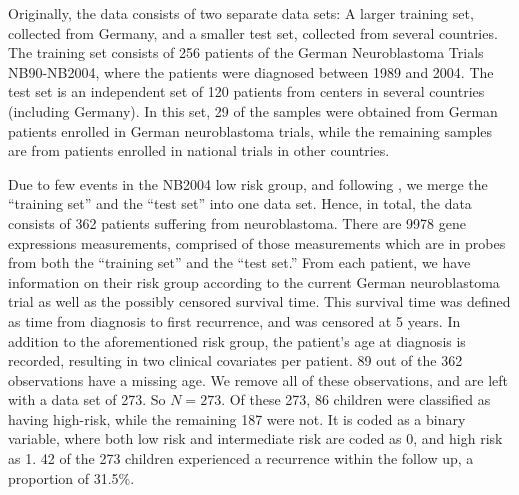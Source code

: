 Originally, the data consists of two separate data sets:
A larger training set, collected from Germany, and a smaller test set, collected from several countries.
The training set consists of 256 patients of the German Neuroblastoma Trials NB90-NB2004, where the patients were diagnosed between 1989 and 2004.
The test set is an independent set of 120 patients from centers in several countries (including Germany).
In this set, 29 of the samples were obtained from German patients enrolled in German neuroblastoma trials, while the remaining samples are from patients enrolled in national trials in other countries.

Due to few events in the NB2004 low risk group, and following \citet{bovelstad2009}, we merge the ``training set'' and the ``test set'' into one data set.
Hence, in total, the data consists of 362 patients suffering from neuroblastoma.
There are 9978 gene expressions measurements, comprised of those measurements which are in probes from both the ``training set'' and the ``test set.''
From each patient, we have information on their risk group according to the current German neuroblastoma trial as well as the possibly censored survival time.
This survival time was defined as time from diagnosis to first recurrence, and was censored at 5 years.
In addition to the aforementioned risk group, the patient's age at diagnosis is recorded, resulting in two clinical covariates per patient.
89 out of the 362 observations have a missing age.
We remove all of these observations, and are left with a data set of 273.
So $N=273$.
Of these 273, 86 children were classified as having high-risk, while the remaining 187 were not.
It is coded as a binary variable, where both low risk and intermediate risk are coded as 0, and high risk as 1.
42 of the 273 children experienced a recurrence within the follow up, a proportion of 31.5\%.


